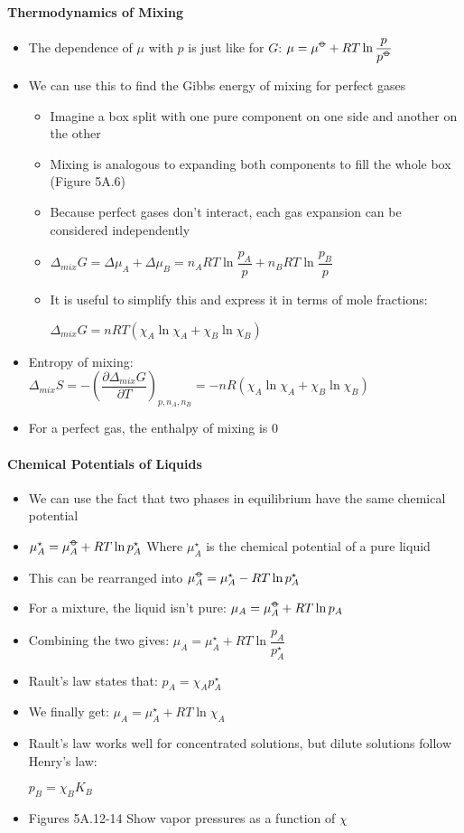 \documentclass[12pt, openany, letterpaper]{memoir}
\begin{document}
\paragraph{Thermodynamics of Mixing}
\begin{itemize}
	\item The dependence of $\mu$ with $p$ is just like for $G$: $\mu=\mu^{\std}+RT\ln\dfrac{p}{p^{\std}}$
	\item We can use this to find the Gibbs energy of mixing for perfect gases
	\begin{itemize}
		\item Imagine a box split with one pure component on one side and another on the other 
		\item Mixing is analogous to expanding both components to fill the whole box (Figure 5A.6)
		\item Because perfect gases don't interact, each gas expansion can be considered independently
		\item $\Delta_{mix}G=\Delta \mu_A + \Delta \mu_B = n_A RT\ln\dfrac{p_A}{p} + n_B RT\ln\dfrac{p_B}{p}$
		\item It is useful to simplify this and express it in terms of mole fractions: 
		
		$\Delta_{mix}G = nRT\left(\chi_A\ln\chi_A + \chi_B\ln\chi_B\right)$
	\end{itemize}
	\item Entropy of mixing: $\Delta_{mix}S = -\left(\dfrac{\partial \Delta_{mix}G}{\partial T}\right)_{p,n_A,n_B} = -nR\left(\chi_A\ln\chi_A + \chi_B\ln\chi_B\right)$
	\item For a perfect gas, the enthalpy of mixing is $0$
\end{itemize}
\paragraph{Chemical Potentials of Liquids}
\begin{itemize}
	\item We can use the fact that two phases in equilibrium have the same chemical potential
	\item $\mu^\star_A = \mu^{\std}_A + RT\ln p^\star_A$ Where $\mu^\star_A$ is the chemical potential of a pure liquid
	\item This can be rearranged into $\mu_A^{\std} = \mu^\star_A-RT\ln p^\star_A$
	\item For a mixture, the liquid isn't pure: $\mu_A = \mu_A^{\std}+RT\ln p_A$
	\item Combining the two gives: $\mu_A = \mu_A^\star + RT\ln\dfrac{p_A}{p_A^\star}$
	\item Rault's law states that: $p_A = \chi_A p_A^{\star}$
	\item We finally get: $\mu_A = \mu_A^{\star} + RT\ln\chi_A$
	\item Rault's law works well for concentrated solutions, but dilute solutions follow Henry's law: 
	
	$p_B = \chi_B K_B$
	\item Figures 5A.12-14 Show vapor pressures as a function of $\chi$
\end{itemize}
\end{document}
